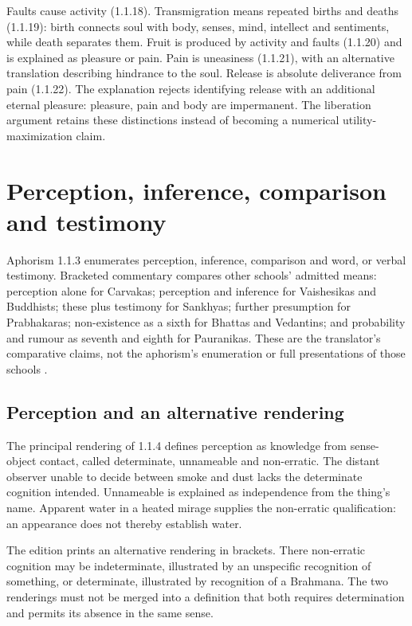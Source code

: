 Faults cause activity (1.1.18). Transmigration means repeated births and deaths
(1.1.19): birth connects soul with body, senses, mind, intellect and sentiments,
while death separates them. Fruit is produced by activity and faults (1.1.20)
and is explained as pleasure or pain. Pain is uneasiness (1.1.21), with an
alternative translation describing hindrance to the soul. Release is absolute
deliverance from pain (1.1.22). The explanation rejects identifying release
with an additional eternal pleasure: pleasure, pain and body are impermanent.
The liberation argument retains these distinctions instead of becoming a
numerical utility-maximization claim.

\section{Perception, inference, comparison and testimony}
\label{sec:p13-nyaya-knowledge-sources}

Aphorism 1.1.3 enumerates perception, inference, comparison and word, or verbal
testimony. Bracketed commentary compares other schools' admitted means:
perception alone for Carvakas; perception and inference for Vaishesikas and
Buddhists; these plus testimony for Sankhyas; further presumption for Prabhakaras;
non-existence as a sixth for Bhattas and Vedantins; and probability and rumour
as seventh and eighth for Pauranikas. These are the translator's comparative
claims, not the aphorism's enumeration or full presentations of those schools
\cite[1.1.3--8, pp.~2--4]{GotamaVidyabhusana1913NyayaSutras}.

\subsection{Perception and an alternative rendering}

The principal rendering of 1.1.4 defines perception as knowledge from
sense-object contact, called determinate, unnameable and non-erratic.
The distant observer unable to decide between smoke and dust lacks the
determinate cognition intended. Unnameable is explained as independence
from the thing's name. Apparent water in a heated mirage supplies the
non-erratic qualification: an appearance does not thereby establish water.

The edition prints an alternative rendering in brackets. There non-erratic
cognition may be indeterminate, illustrated by an unspecific recognition
of something, or determinate, illustrated by recognition of a Brahmana.
The two renderings must not be merged into a definition that both requires
determination and permits its absence in the same sense.

